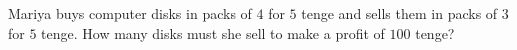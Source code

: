 Mariya buys computer disks in packs of $4$ for $5$ tenge and sells them in packs of $3$ for $5$ tenge. How many disks must she sell to make a profit of $100$ tenge?
